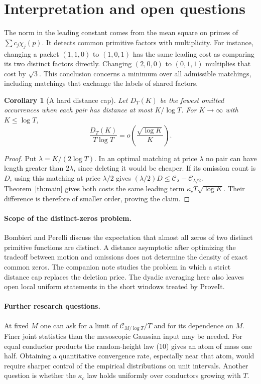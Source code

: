 \documentclass[11pt]{article}
\newtheorem{corollary}[theorem]{Corollary}
\newcommand{\cost}{\mathcal C}
\begin{document}
\section{Interpretation and open questions}
The norm in the leading constant comes from the mean square on primes of $\sum c_j\chi_j(p)$. It detects common primitive factors with multiplicity. For instance, changing a packet $(1,1,0)$ to $(1,0,1)$ has the same leading cost as comparing its two distinct factors directly. Changing $(2,0,0)$ to $(0,1,1)$ multiplies that cost by $\sqrt3$. This conclusion concerns a minimum over all admissible matchings, including matchings that exchange the labels of shared factors.

\begin{corollary}[A hard distance cap]
Let $D_T(K)$ be the fewest omitted occurrences when each pair has distance at most $K/\log T$. For $K\to\infty$ with $K\le\log T$,
\[
 \frac{D_T(K)}{T\log T}=o\!\left(\frac{\sqrt{\log K}}{K}\right).
\]
\end{corollary}
\begin{proof}
Put $\lambda=K/(2\log T)$. In an optimal matching at price $\lambda$ no pair can have length greater than $2\lambda$, since deleting it would be cheaper. If its omission count is $D$, using this matching at price $\lambda/2$ gives
$(\lambda/2)D\le\cost_\lambda-\cost_{\lambda/2}$. Theorem~\ref{th:main} gives both costs the same leading term $\kappa_c T\sqrt{\log K}$. Their difference is therefore of smaller order, proving the claim.
\end{proof}

\paragraph{Scope of the distinct-zeros problem.}
Bombieri and Perelli \cite[p.~274]{bp} discuss the expectation that almost all zeros of two distinct primitive functions are distinct. A distance asymptotic after optimizing the tradeoff between motion and omissions does not determine the density of exact common zeros. The companion note studies the problem in which a strict distance cap replaces the deletion price. The dyadic averaging here also leaves open local uniform statements in the short windows treated by ProveIt.

\paragraph{Further research questions.}
At fixed $M$ one can ask for a limit of $\cost_{M/\log T}/T$ and for its dependence on $M$. Finer joint statistics than the mesoscopic Gaussian input may be needed. For equal conductor products the random-height law (10) gives an atom of mass one half. Obtaining a quantitative convergence rate, especially near that atom, would require sharper control of the empirical distributions on unit intervals. Another question is whether the $\kappa_c$ law holds uniformly over conductors growing with $T$.
\end{document}
